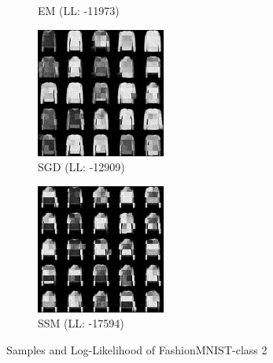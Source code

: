 \begin{figure}[H]
\begin{subfigure}[b]{0.24\textwidth}
        \caption{EM (LL: -11973)}
    \end{subfigure}
    \begin{subfigure}[b]{0.24\textwidth}
        \centering
        \includegraphics[width=\textwidth]{figures/einsum/fashion-mnist/2fashion-mnist_SGD.png} 
        \caption{SGD (LL: -12909)}
    \end{subfigure}
    \begin{subfigure}[b]{0.24\textwidth}
        \centering
        \includegraphics[width=\textwidth]{figures/einsum/fashion-mnist/2fashion-mnist_SSM.png}
        \caption{SSM (LL: -17594)}
    \end{subfigure}
    \caption{Samples and Log-Likelihood of FashionMNIST-class 2}
\end{figure}


